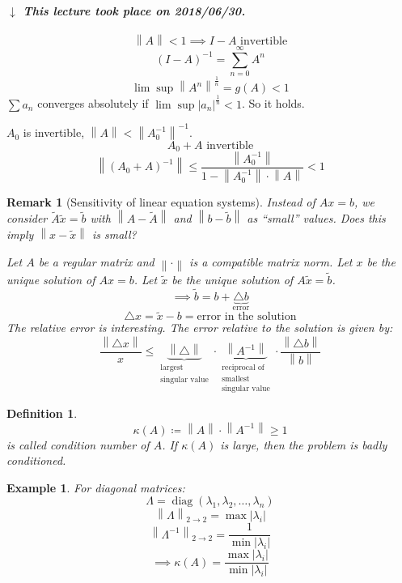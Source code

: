 \documentclass{article}
\newtheorem{example}{Example}  \numberwithin{example}{section}
\newtheorem{definition}{Definition}  \numberwithin{definition}{section}
\newtheorem{remark}{Remark}  \numberwithin{remark}{section}
\newcommand{\norm}[1]{\left\|#1\right\|}
\newcommand{\card}[1]{\left|#1\right|}
\newcommand{\dateref}[1]{%
  \begin{mdframed}[backgroundcolor=gray!10,innerbottommargin=0pt,innertopmargin=0pt]
    \paragraph{\textit{$\downarrow$ This lecture took place on #1.}}%
  \end{mdframed}%
}
\begin{document}
\dateref{2018/06/30}

\[ \norm{A} < 1 \implies I-A \text{ invertible} \]
\[ (I - A)^{-1} = \sum_{n=0}^\infty A^n \]
\[ \lim\sup \norm{A^n}^{\frac1n} = g(A) < 1 \]
$\sum a_n$ converges absolutely if $\lim\sup{\card{a_n}^{\frac1n}} < 1$. So it holds.

$A_0$ is invertible, $\norm{A} < \norm{A_0^{-1}}^{-1}$.
\[ A_0 + A \text{ invertible} \]
\[ \norm{(A_0 + A)^{-1}} \leq \frac{\norm{A_0^{-1}}}{1 - \norm{A_0^{-1}} \cdot \norm{A}} < 1 \]

\begin{remark}[Sensitivity of linear equation systems] %
  \label{rem:sens}
  Instead of $Ax = b$, we consider $\tilde A \tilde x = \tilde b$
  with $\norm{A - \tilde A}$ and $\norm{b - \tilde b}$ as \enquote{small} values.
  Does this imply $\norm{x - \tilde x}$ is small?

  Let $A$ be a regular matrix and $\norm{\cdot}$ is a compatible matrix norm.
  Let $x$ be the unique solution of $Ax = b$.
  Let $\tilde x$ be the unique solution of $A \tilde x = \tilde b$.
  \[ \implies \tilde b = b + \underbrace{\triangle b}_{\text{error}} \]
  \[ \triangle x = \tilde x - b = \text{error in the solution} \]
  The relative error is interesting.
  The error relative to the solution is given by:
  \[ \frac{\norm{\triangle x}}{x} \leq \underbrace{\norm{\triangle}}_{\substack{\text{largest} \\ \text{singular value}}} \cdot \underbrace{\norm{A^{-1}}}_{\substack{\text{reciprocal of} \\ \text{smallest} \\ \text{singular value}}} \cdot \frac{\norm{\triangle b}}{\norm{b}} \]
\end{remark}

\begin{definition} %
  \[ \kappa(A) \coloneqq \norm{A} \cdot \norm{A^{-1}} \geq 1 \]
  is called \emph{condition number of $A$}.
  If $\kappa(A)$ is large, then the problem is badly conditioned.
\end{definition}

\begin{example} %
  For diagonal matrices:
  \[ \Lambda = \operatorname{diag}(\lambda_1, \lambda_2, \dots, \lambda_n) \]
  \[ \norm{\Lambda}_{2 \to 2} = \max\card{\lambda_i} \]
  \[ \norm{\Lambda^{-1}}_{2 \to 2} = \frac{1}{\min\card{\lambda_i}} \]
  \[ \implies \kappa(A) = \frac{\max\card{\lambda_i}}{\min\card{\lambda_i}} \]
\end{example}
\end{document}
